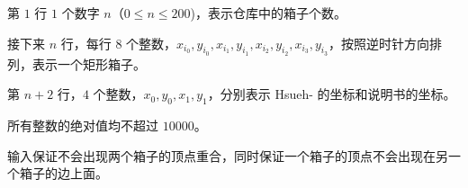 第 $1$ 行 $1$ 个数字 $n$（$0 \leqslant n \leqslant 200$)，表示仓库中的箱子个数。

接下来 $n$ 行，每行 $8$ 个整数，$x_{i_0},y_{i_0},x_{i_1},y_{i_1},x_{i_2},y_{i_2},x_{i_3},y_{i_3}$，按照逆时针方向排列，表示一个矩形箱子。

第 $n+2$ 行，$4$ 个整数，$x_0,y_0,x_1,y_1$，分别表示 Hsueh- 的坐标和说明书的坐标。

所有整数的绝对值均不超过 $10000$。

输入保证不会出现两个箱子的顶点重合，同时保证一个箱子的顶点不会出现在另一个箱子的边上面。

